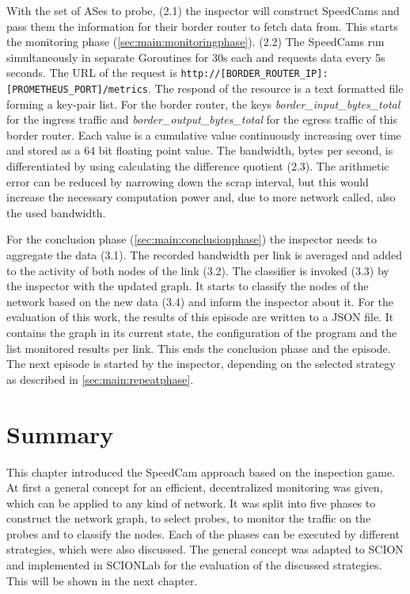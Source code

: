 \documentclass[thesis.tex]{subfiles}
\begin{document}
With the set of ASes to probe, (2.1) the inspector will construct SpeedCams and pass them the information for their border router to fetch data from. This starts the monitoring phase (\autoref{sec:main:monitoringphase}). (2.2) The SpeedCams run simultaneously in separate Goroutines for 30s each and requests data every 5s seconds. The URL of the request is \lstinline|http://[BORDER_ROUTER_IP]:[PROMETHEUS_PORT]/metrics|. The respond of the resource is a text formatted file forming a key-pair list. For the border router, the keys \textit{border\_input\_bytes\_total} for the ingress traffic and \textit{border\_output\_bytes\_total} for the egress traffic of this border router. Each value is a cumulative value continuously increasing over time and stored as a 64 bit floating point value. The bandwidth, bytes per second, is differentiated by using calculating the difference quotient (2.3). The arithmetic error can be reduced by narrowing down the scrap interval, but this would increase the necessary computation power and, due to more network called, also the used bandwidth.

For the conclusion phase (\autoref{sec:main:conclusionphase}) the inspector needs to aggregate the data (3.1). The recorded bandwidth per link is averaged and added to the activity of both nodes of the link (3.2). The classifier is invoked (3.3) by the inspector with the updated graph. It starts to classify the nodes of the network based on the new data (3.4) and inform the inspector about it. For the evaluation of this work, the results of this episode are written to a JSON file. It contains the graph in its current state, the configuration of the program and the list monitored results per link. This ends the conclusion phase and the episode. The next episode is started by the inspector, depending on the selected strategy as described in \autoref{sec:main:repeatphase}.

\section{Summary}
This chapter introduced the SpeedCam approach based on the inspection game. At first a general concept for an efficient, decentralized monitoring was given, which can be applied to any kind of network. It was split into five phases to construct the network graph, to select probes, to monitor the traffic on the probes and to classify the nodes. Each of the phases can be executed by different strategies, which were also discussed. The general concept was adapted to SCION and implemented in SCIONLab for the evaluation of the discussed strategies. This will be shown in the next chapter.
\subfilebib %
\end{document}
